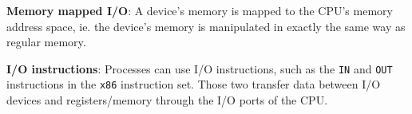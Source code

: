 
\textbf{Memory mapped I/O}: A device's memory is mapped to the CPU's memory address space, ie. the device's memory is manipulated in exactly the same way as regular memory.

\textbf{I/O instructions}: Processes can use I/O instructions, such as the \texttt{IN} and \texttt{OUT} instructions in the \texttt{x86} instruction set. Those two transfer data between I/O devices and registers/memory through the I/O ports of the CPU.


